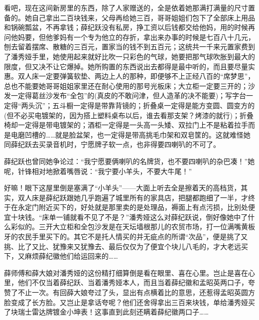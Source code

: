 \par 看吧，现在这间新房里的东西，除了人家赠送的，全是依着她那满打满量的尺寸置备的。她自己拿出二百块钱来，父母再给她三百，哥哥姐姐们包下了全部床上用品和锅碗瓢盆，不再拿钱；薛纪跃没有私房，挣工资以后钱都交给他妈，用的时候再问他妈要，但他爹妈有一个专为他立的存折，拿出来办事的时候是七百八十几元，刨去留着摆席、散糖的三百元，置家当的钱不到五百元；这统共一千来元置家费到了潘秀娅手里，她使用起来就好比吹一只彩色的气球，她要把那气球吹胀到最大的限度，但又决不让它爆掉。她所购置的东西说出去都得是最中听的，而且要尽量实惠。双人床一定要弹簧软垫、两边上人的那种，即便够不上正经八百的“席梦思”，总也不能要她哥哥姐姐家里还在耐心使用的那号光板床；大立柜一定要三开的；沙发一定得葛丝沙发布“全包”的(真皮的不敢问津，但人造革的决不能要)；写字台一定得“两头沉”；五斗橱一定得是带靠背镜的；折叠桌一定得是能方变圆、圆变方的(但不必买电镀架的，因为搭上塑料桌布以后，谁去看那支架？烤漆的就行)；折叠椅却一定得是带电镀架的；酒柜一定得是一头高一头矮、双拉门上不是粘着拉手而是电磨凹槽的……就是脸盆架，也一定得是带高挑毛巾架和双皂筐的。这就难怪她同薛纪跃去买录音机时，宁愿牌子软一点，也非得要四喇叭的不可了。
\par 薛纪跃也曾同她争论过：“我宁愿要俩喇叭的名牌货，也不要四喇叭的杂巴凑！”她呢，针锋相对地掀着嘴唇说：“我宁要小羊头，不要大牛尾！”
\par 好嘛！眼下这屋里倒是塞满了“小羊头”——大面上听去全是擦着天的高档货，其实，双人床是薛纪跃跟她几乎跑遍了城里所有的家具店，把腿都跑细了一半，才终于在永定门附近买下的，好处就是那里卖的是处理品，褥面上有点污损，比别处便宜十块钱。“床单一铺就看不见了不是？”潘秀娅这么对薛纪跃说，倒好像她中了什么彩似的。三开大立柜和全包沙发是在天坛墙根那儿的农贸市场，打一位满嘴黄板牙的农民手里买下的。其它不是托人情买的并无疵点的所谓“次品”，便是挑了又挑、比了又比、犹豫来又犹豫去、最后仅仅为了便宜个块儿八毛的，才大老远买下，又麻烦薛纪徽他们给运回来的……
\par 薛师傅和薛大娘对潘秀娅的这份精打细算倒是看在眼里、喜在心里。岂止是喜在心里，他们不仅当着薛纪跃、当着潘秀娅本人，而且当着薛纪徽和孟昭英两口子，夸赞了不止一次。有回薛大娘夸过了头，显出有点横着比的意思，还惹得孟昭英圆方脸变成了长方脸。又岂止是拿话夸呢？他们还舍得拿出三百来块钱，单给潘秀娅买了块瑞士雷达牌镀金小坤表！这事直到此刻还瞒着薛纪徽两口子……
